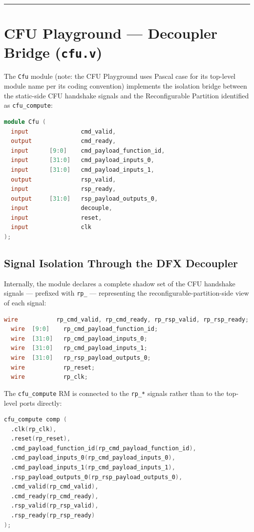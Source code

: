 \vspace{0.4em}\hrule\vspace{0.4em}

\section{CFU Playground — Decoupler Bridge (\texttt{cfu.v})}

The \texttt{Cfu} module (note: the CFU Playground uses Pascal case for its top-level module name per its coding convention) implements the isolation bridge between the static-side CFU handshake signals and the Reconfigurable Partition identified as \texttt{cfu\_compute}:

\begin{lstlisting}[style=mystyle, language=Verilog]
module Cfu (
  input               cmd_valid,
  output              cmd_ready,
  input      [9:0]    cmd_payload_function_id,
  input      [31:0]   cmd_payload_inputs_0,
  input      [31:0]   cmd_payload_inputs_1,
  output              rsp_valid,
  input               rsp_ready,
  output     [31:0]   rsp_payload_outputs_0,
  input               decouple,
  input               reset,
  input               clk
);
\end{lstlisting}

\subsection{Signal Isolation Through the DFX Decoupler}

Internally, the module declares a complete shadow set of the CFU handshake signals — prefixed with \texttt{rp\_} — representing the reconfigurable-partition-side view of each signal:

\begin{lstlisting}[style=mystyle, language=Verilog]
  wire           rp_cmd_valid, rp_cmd_ready, rp_rsp_valid, rp_rsp_ready;
  wire  [9:0]    rp_cmd_payload_function_id;
  wire  [31:0]   rp_cmd_payload_inputs_0;
  wire  [31:0]   rp_cmd_payload_inputs_1;
  wire  [31:0]   rp_rsp_payload_outputs_0;
  wire           rp_reset;
  wire           rp_clk;
\end{lstlisting}

The \texttt{cfu\_compute} RM is connected to the \texttt{rp\_*} signals rather than to the top-level ports directly:

\begin{lstlisting}[style=mystyle, language=Verilog]
cfu_compute comp (
  .clk(rp_clk),
  .reset(rp_reset),
  .cmd_payload_function_id(rp_cmd_payload_function_id),
  .cmd_payload_inputs_0(rp_cmd_payload_inputs_0),
  .cmd_payload_inputs_1(rp_cmd_payload_inputs_1),
  .rsp_payload_outputs_0(rp_rsp_payload_outputs_0),
  .cmd_valid(rp_cmd_valid),
  .cmd_ready(rp_cmd_ready),
  .rsp_valid(rp_rsp_valid),
  .rsp_ready(rp_rsp_ready)
);
\end{lstlisting}

